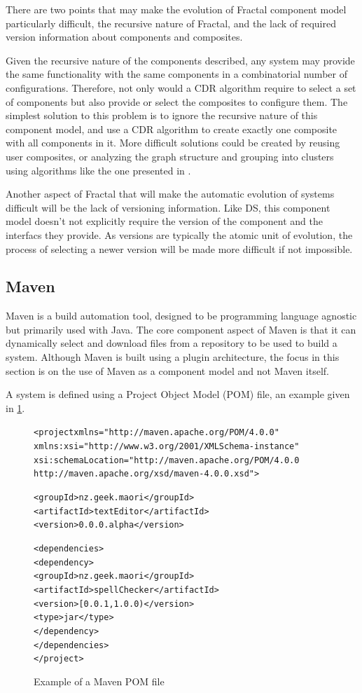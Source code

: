 There are two points that may make the evolution of Fractal component model particularly difficult,
the recursive nature of Fractal, and the lack of required version information about components and composites.

Given the recursive nature of the components described, any system may provide the same functionality with the same components in a combinatorial number of configurations.
Therefore, not only would a CDR algorithm require to select a set of components but also provide or select the composites to configure them.
The simplest solution to this problem is to ignore the recursive nature of this component model,
and use a CDR algorithm to create exactly one composite with all components in it.
More difficult solutions could be created by reusing user composites, or analyzing the graph structure and grouping into clusters using algorithms like the one presented in \cite{dietrich2008cluster}.

Another aspect of Fractal that will make the automatic evolution of systems difficult will be the lack of versioning information.
Like DS, this component model doesn't not explicitly require the version of the component and the interfacs they provide.
As versions are typically the atomic unit of evolution, the process of selecting a newer version will be made more difficult if not impossible. 

\subsection{Maven}
Maven is a build automation tool, designed to be programming language agnostic but primarily used with Java.
The core component aspect of Maven is that it can dynamically select and download files from a repository to be used to build a system.
Although Maven is built using a plugin architecture, the focus in this section is on the use of Maven as a component model and not Maven itself.

A system is defined using a Project Object Model (POM) file, an example given in \ref{mavenmetadata}. 

\begin{figure}[htp]
\begin{center}
\begin{alltt}
<project xmlns="http://maven.apache.org/POM/4.0.0"
  xmlns:xsi="http://www.w3.org/2001/XMLSchema-instance"
  xsi:schemaLocation="http://maven.apache.org/POM/4.0.0
                      http://maven.apache.org/xsd/maven-4.0.0.xsd">

  <groupId>nz.geek.maori</groupId>
  <artifactId>textEditor</artifactId>
  <version>0.0.0.alpha</version>

  <dependencies>
    <dependency>
      <groupId>nz.geek.maori</groupId>
      <artifactId>spellChecker</artifactId>
      <version>[0.0.1,1.0.0)</version>
      <type>jar</type>
     </dependency>
  </dependencies>
</project>
\end{alltt}
  \caption[Maven POM file]{Example of a Maven POM file}
  \label{mavenmetadata}
\end{center}
\end{figure}

